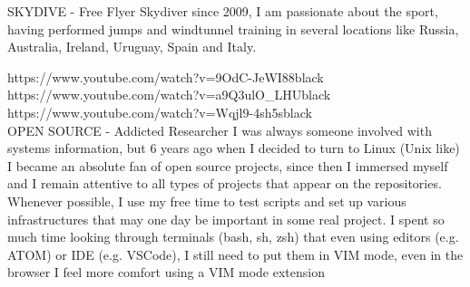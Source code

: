 \newpage
{}

\cvmetaevent
{SKYDIVE - Free Flyer}
{}
{}
{Skydiver since 2009, I am passionate about the sport, having performed
	jumps and windtunnel training in several locations like Russia, Australia,
	Ireland, Uruguay, Spain and Italy.}

{https://www.youtube.com/watch?v=9OdC-JeWI88}{black}\\[6pt]
{https://www.youtube.com/watch?v=a9Q3ulO_LHU}{black}\\[6pt]
{https://www.youtube.com/watch?v=Wqjl9-4sh5s}{black}\\[6pt]

\cvmetaevent
{OPEN SOURCE - Addicted Researcher}
{}
{}
{I was always someone involved with systems information, but 6 years ago
	when I decided to turn to Linux (Unix like) I became an absolute fan of
	open source projects, since then I immersed myself and I remain attentive
	to all types of projects that appear on the repositories. Whenever possible,
	I use my free time to test scripts and set up various infrastructures that
	may one day be important in some real project. I spent so much time looking
	through terminals (bash, sh, zsh) that even using editors (e.g. ATOM) or IDE
	(e.g. VSCode), I still need to put them in VIM mode, even in the browser I feel
	more comfort using a VIM mode extension}


\vfill